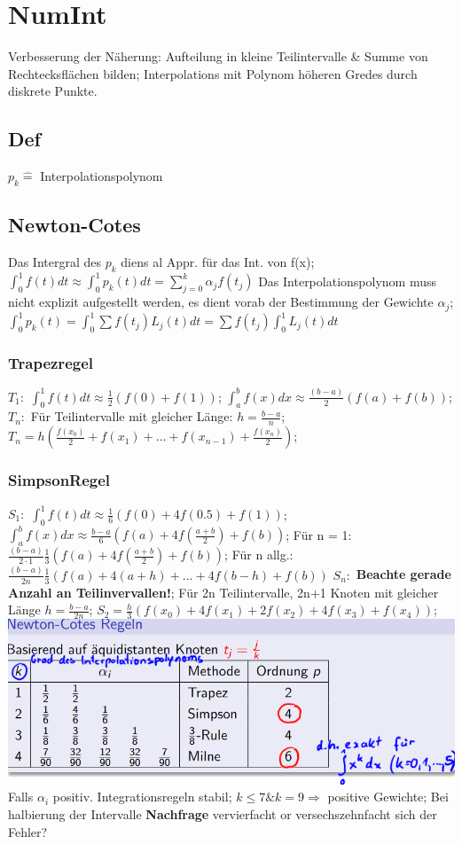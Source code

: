 \section{NumInt}
Verbesserung der Näherung: Aufteilung in kleine Teilintervalle \& Summe von Rechtecksflächen bilden; Interpolations mit Polynom höheren Gredes durch diskrete Punkte.
\subsection{Def}
$ p_{k} \hat{=} $ Interpolationspolynom

\subsection{Newton-Cotes}
Das Intergral des $ p_{k} $ diens al Appr. für das Int. von f(x); 
$ \int_{0}^{1} f(t) dt \approx \int_{0}^{1} p_{k} (t) dt =  \sum_{j=0}^{k} \alpha_j f( t_{j} ) $ Das Interpolationspolynom muss nicht explizit aufgestellt werden, es dient vorab der Bestimmung der Gewichte $ \alpha_{j} $; 
$ \int_{0}^{1} p_{k}(t) = \int_{0}^{1} \sum f( t_{j} ) L_{j} (t) dt = \sum f ( t_{j} ) \int_{0}^{1} L_{j} (t) dt $
\subsubsection{Trapezregel}
$ T_{1}: $ 
$ \int_{0}^{1} f (t) dt \approx \frac{1}{2} ( f(0) + f(1) ) $; 
$ \int_{a}^{b} f (x) dx \approx \frac{(b-a)}{2} (f(a) + f(b) ) $;\\
$ T_{n}: $
Für Teilintervalle mit gleicher Länge: $ h = \frac{b-a}{n} $;  
$ T_{n} = h (\frac{ f ( x_{0} ) }{2} + f(x_{1}) + ... + f(x_{n-1}) + \frac{ f(x_n) }{2} ) $; 
\subsubsection{SimpsonRegel}
$ S_{1}: $ 
$ \int_{0}^{1} f (t) dt \approx \frac{1}{6} ( f(0) + 4f(0.5) + f(1) ) $; 
$\int_{a}^{b} f (x) dx \approx \frac{b-a}{6} ( f(a) + 4f( \frac{a+b}{2}) + f(b) ) $; 
Für n = 1: $\frac{( b-a )}{2\cdot1} \frac{1}{3} ( f(a) + 4f( \frac{a+b}{2}) + f(b) ) $; 
Für n allg.: $ \frac{( b-a) }{2n}\frac{1}{3} ( f(a) + 4(a+h) + ... + 4f(b-h)+ f(b) ) $ 
$ S_{n}:$ 
\textbf{Beachte gerade Anzahl an Teilinvervallen!}; 
Für 2n Teilintervalle, 2n+1 Knoten mit gleicher Länge $ h = \frac{ b-a }{2n} $; 
$ S_{2} = \frac{h}{3} ( f(x_{0}) + 4f(x_{1}) + 2f(x_{2}) + 4f(x_{3}) + f(x_{4}) ) $; 
\includegraphics[scale=0.25]{./pic/NewtonCodesRegeln.png}
Falls $\alpha_{i} $ positiv. Integrationsregeln stabil; 
$ k \le 7 \& k =9 \Rightarrow $ positive Gewichte;
Bei halbierung der Intervalle \textbf{Nachfrage} vervierfacht or versechszehnfacht sich der Fehler?
